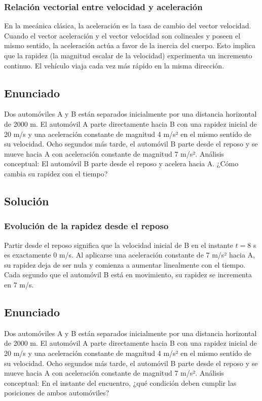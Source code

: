 \documentclass[12pt, a4paper]{article}
\begin{document}
\subsubsection*{Relación vectorial entre velocidad y aceleración}
En la mecánica clásica, la aceleración es la tasa de cambio del vector velocidad. Cuando el vector aceleración y el vector velocidad son colineales y poseen el mismo sentido, la aceleración actúa a favor de la inercia del cuerpo. Esto implica que la rapidez (la magnitud escalar de la velocidad) experimenta un incremento continuo. El vehículo viaja cada vez más rápido en la misma dirección.

\newpage
\subsection*{Enunciado}
 Dos automóviles A y B están separados inicialmente por una distancia horizontal de 2000 m. El automóvil A parte directamente hacia B con una rapidez inicial de 20 m/s y una aceleración constante de magnitud 4 m/s² en el mismo sentido de su velocidad. Ocho segundos más tarde, el automóvil B parte desde el reposo y se mueve hacia A con aceleración constante de magnitud 7 m/s².
 Análisis conceptual: El automóvil B parte desde el reposo y acelera hacia A. ¿Cómo cambia su rapidez con el tiempo?

\subsection*{Solución}

\subsubsection*{Evolución de la rapidez desde el reposo}
Partir desde el reposo significa que la velocidad inicial de B en el instante $t = 8$ s es exactamente 0 m/s. Al aplicarse una aceleración constante de 7 m/s² hacia A, su rapidez deja de ser nula y comienza a aumentar linealmente con el tiempo. Cada segundo que el automóvil B está en movimiento, su rapidez se incrementa en 7 m/s.

\newpage
\subsection*{Enunciado}
 Dos automóviles A y B están separados inicialmente por una distancia horizontal de 2000 m. El automóvil A parte directamente hacia B con una rapidez inicial de 20 m/s y una aceleración constante de magnitud 4 m/s² en el mismo sentido de su velocidad. Ocho segundos más tarde, el automóvil B parte desde el reposo y se mueve hacia A con aceleración constante de magnitud 7 m/s².
 Análisis conceptual: En el instante del encuentro, ¿qué condición deben cumplir las posiciones de ambos automóviles?
\end{document}
